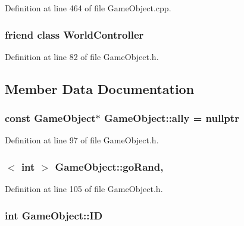 Definition at line 464 of file Game\-Object.\-cpp.

\hypertarget{class_game_object_a19ecfd085a11c42d868e25c796419df8}{
\subsubsection[{World\-Controller}]{\setlength{\rightskip}{0pt plus 5cm}friend class {\bf World\-Controller}\hspace{0.3cm}{\ttfamily [friend]}}}\label{class_game_object_a19ecfd085a11c42d868e25c796419df8}


Definition at line 82 of file Game\-Object.\-h.



\subsection{Member Data Documentation}
\hypertarget{class_game_object_a33c6fbb5bee4bf28ed70ae170b2fdb1a}{
\subsubsection[{ally}]{\setlength{\rightskip}{0pt plus 5cm}const {\bf Game\-Object}$\ast$ Game\-Object\-::ally = nullptr\hspace{0.3cm}{\ttfamily [protected]}}}\label{class_game_object_a33c6fbb5bee4bf28ed70ae170b2fdb1a}


Definition at line 97 of file Game\-Object.\-h.

\hypertarget{class_game_object_adc2b5a062ff3d5ee496f47a0206ddcc7}{
\subsubsection[{go\-Rand}]{$<$ int $>$ Game\-Object\-::go\-Rand\hspace{0.3cm}{\ttfamily [static]}, {\ttfamily [protected]}}}\label{class_game_object_adc2b5a062ff3d5ee496f47a0206ddcc7}


Definition at line 105 of file Game\-Object.\-h.

\hypertarget{class_game_object_a4db8b68d725cbea63ea94ced03add071}{
\subsubsection[{I\-D}]{\setlength{\rightskip}{0pt plus 5cm}int Game\-Object\-::\-I\-D\hspace{0.3cm}{\ttfamily [protected]}}}\label{class_game_object_a4db8b68d725cbea63ea94ced03add071}


